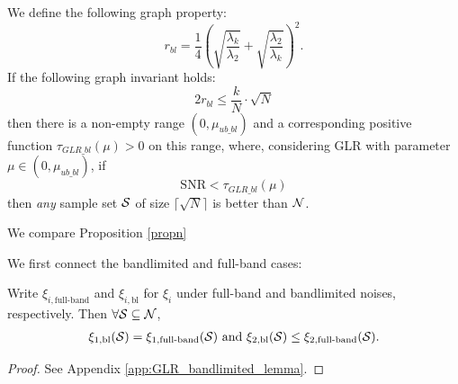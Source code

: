 {{\color{black}
\begin{propn}
\label{propn:GLR_bl_simple}
We define the following graph property:
    \begin{equation}
        r_{bl}=\frac{1}{4}\left(\sqrt{\frac{\lambda_{k}}{\lambda_{2}}} + \sqrt{\frac{\lambda_{2}}{\lambda_{k}}}\right)^{2}.
    \end{equation}
    If the following graph invariant holds:
    \begin{equation}
        2r_{bl} \leq \frac{k}{N} \cdot \sqrt{N}
    \end{equation}
    then there is a non-empty range $(0,\mu_{ub\_bl})$ and a corresponding positive function $\tau_{GLR\_bl}(\mu) > 0$ on this range, where, considering GLR with parameter $\mu \in (0,\mu_{ub\_bl})$, if
    \begin{equation}
        \text{SNR} < \tau_{GLR\_bl}(\mu)
    \end{equation}
    then \emph{any} sample set $\mathcal{S}$ of size $\lceil\sqrt{N}\rceil$ is better than $\mathcal{N}$.
\end{propn}


We compare Proposition \ref{propn}

}


We first connect the bandlimited and full-band cases: %
\begin{lemma}
\label{lemma:bl_xi_2_leq_regular_xi_2}
    Write $\xi_{i, \textrm{full-band}}$ and $\xi_{i, \textrm{bl}}$ for $\xi_{i}$ under full-band and bandlimited noises, respectively. Then $\forall \mathcal{S} \subseteq \mathcal{N}$,
    \begin{align}
      \xi_{1, \textrm{bl}}(\mathcal{S}) = \xi_{1, \textrm{full-band}}(\mathcal{S}) \text{ and }
      \xi_{2, \textrm{bl}}(\mathcal{S}) \leq \xi_{2, \textrm{full-band}}(\mathcal{S}).
    \end{align}
\end{lemma}
\begin{proof}
    See Appendix \ref{app:GLR_bandlimited_lemma}.
\end{proof}
\fi

}
